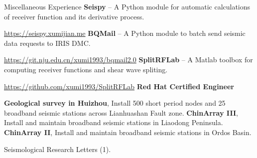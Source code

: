 \begin{rubric}{Miscellaneous Experience}
%
\entry*[2016] \textbf{Seispy} -- A Python module for automatic calculations of receiver function and its derivative process.
    
    \url{https://seispy.xumijian.me}
\entry*[2015] \textbf{BQMail} -- A Python module to batch send seismic data requests to IRIS DMC.
    
    \url{https://git.nju.edu.cn/xumi1993/bqmail2.0}
\entry*[2014] \textbf{SplitRFLab} -- A Matlab toolbox for computing receiver functions and shear wave spliting.

    \url{https://github.com/xumi1993/SplitRFLab}
\entry*[2015] \textbf{Red Hat Certified Engineer}

\entry*[2019] \textbf{Geological survey in Huizhou}, Install 500 short period nodes and 25 broadband seismic stations across Lianhuashan Fault zone.
\entry*[2018 -- 2020] \textbf{ChinArray III}, Install and maintain broadband seismic stations in Liaodong Peninsula.
\entry*[2013 -- 2016] \textbf{ChinArray II}, Install and maintain broadband seismic stations in Ordos Basin.

\entry*[]Seismological Research Letters (1).
\end{rubric}